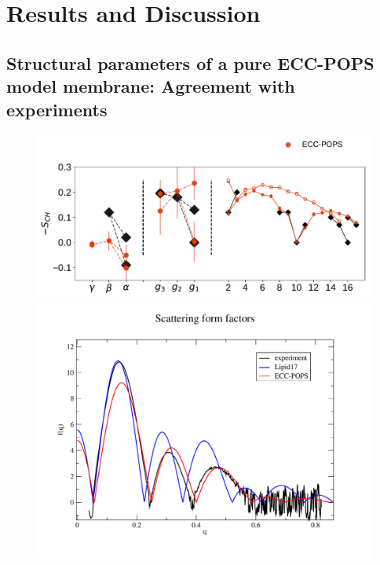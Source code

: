 \documentclass[journal=jpcbfk,manuscript=article]{achemso}
\newlength{\figwidth}
\begin{document}

\section{Results and Discussion} 
 
\subsection{Structural parameters of a pure ECC-POPS model membrane: Agreement with experiments} 
 
\begin{figure}[tb!] 
  \centering 
  \includegraphics[width=\figwidth]{../Fig/order_parameters_actual_pure-POPS.pdf} \\
  \includegraphics[width=0.7\figwidth]{../Fig/form-f_l17-ecc-pops-exp_compar.pdf} 

\end{figure}
\end{document}
